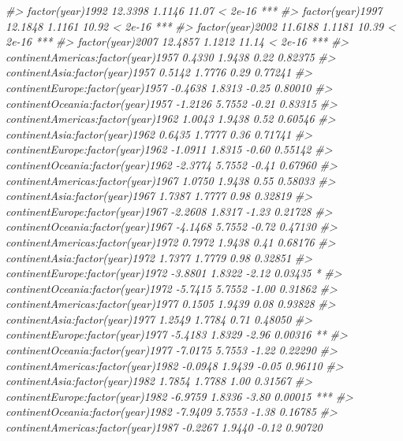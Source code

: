 \documentclass[
]{book}
\newenvironment{Shaded}{\begin{snugshade}}{\end{snugshade}}
\newcommand{\CommentTok}[1]{\textcolor[rgb]{0.56,0.35,0.01}{\textit{#1}}}
\begin{document}
\begin{Shaded}
\begin{Highlighting}[]
\CommentTok{#> factor(year)1992                    12.3398     1.1146   11.07  < 2e-16 ***}
\CommentTok{#> factor(year)1997                    12.1848     1.1161   10.92  < 2e-16 ***}
\CommentTok{#> factor(year)2002                    11.6188     1.1181   10.39  < 2e-16 ***}
\CommentTok{#> factor(year)2007                    12.4857     1.1212   11.14  < 2e-16 ***}
\CommentTok{#> continentAmericas:factor(year)1957   0.4330     1.9438    0.22  0.82375    }
\CommentTok{#> continentAsia:factor(year)1957       0.5142     1.7776    0.29  0.77241    }
\CommentTok{#> continentEurope:factor(year)1957    -0.4638     1.8313   -0.25  0.80010    }
\CommentTok{#> continentOceania:factor(year)1957   -1.2126     5.7552   -0.21  0.83315    }
\CommentTok{#> continentAmericas:factor(year)1962   1.0043     1.9438    0.52  0.60546    }
\CommentTok{#> continentAsia:factor(year)1962       0.6435     1.7777    0.36  0.71741    }
\CommentTok{#> continentEurope:factor(year)1962    -1.0911     1.8315   -0.60  0.55142    }
\CommentTok{#> continentOceania:factor(year)1962   -2.3774     5.7552   -0.41  0.67960    }
\CommentTok{#> continentAmericas:factor(year)1967   1.0750     1.9438    0.55  0.58033    }
\CommentTok{#> continentAsia:factor(year)1967       1.7387     1.7777    0.98  0.32819    }
\CommentTok{#> continentEurope:factor(year)1967    -2.2608     1.8317   -1.23  0.21728    }
\CommentTok{#> continentOceania:factor(year)1967   -4.1468     5.7552   -0.72  0.47130    }
\CommentTok{#> continentAmericas:factor(year)1972   0.7972     1.9438    0.41  0.68176    }
\CommentTok{#> continentAsia:factor(year)1972       1.7377     1.7779    0.98  0.32851    }
\CommentTok{#> continentEurope:factor(year)1972    -3.8801     1.8322   -2.12  0.03435 *  }
\CommentTok{#> continentOceania:factor(year)1972   -5.7415     5.7552   -1.00  0.31862    }
\CommentTok{#> continentAmericas:factor(year)1977   0.1505     1.9439    0.08  0.93828    }
\CommentTok{#> continentAsia:factor(year)1977       1.2549     1.7784    0.71  0.48050    }
\CommentTok{#> continentEurope:factor(year)1977    -5.4183     1.8329   -2.96  0.00316 ** }
\CommentTok{#> continentOceania:factor(year)1977   -7.0175     5.7553   -1.22  0.22290    }
\CommentTok{#> continentAmericas:factor(year)1982  -0.0948     1.9439   -0.05  0.96110    }
\CommentTok{#> continentAsia:factor(year)1982       1.7854     1.7788    1.00  0.31567    }
\CommentTok{#> continentEurope:factor(year)1982    -6.9759     1.8336   -3.80  0.00015 ***}
\CommentTok{#> continentOceania:factor(year)1982   -7.9409     5.7553   -1.38  0.16785    }
\CommentTok{#> continentAmericas:factor(year)1987  -0.2267     1.9440   -0.12  0.90720    }

\end{Highlighting}
\end{Shaded}
\end{document}
